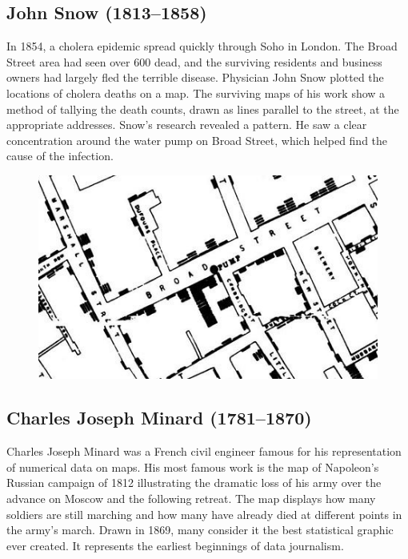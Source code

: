 \documentclass[]{book}
\theoremstyle{definition}
\theoremstyle{definition}
\theoremstyle{definition}
\theoremstyle{remark}
\begin{document}
\subsection{John Snow (1813--1858)}\label{john-snow-18131858}

In 1854, a cholera epidemic spread quickly through Soho in London. The
Broad Street area had seen over 600 dead, and the surviving residents
and business owners had largely fled the terrible disease. Physician
John Snow plotted the locations of cholera deaths on a map. The
surviving maps of his work show a method of tallying the death counts,
drawn as lines parallel to the street, at the appropriate addresses.
Snow's research revealed a pattern. He saw a clear concentration around
the water pump on Broad Street, which helped find the cause of the
infection.

\begin{figure}
\centering
\includegraphics{images/Snow.png}
\caption{}
\end{figure}

\subsection{Charles Joseph Minard
(1781--1870)}\label{charles-joseph-minard-17811870}

Charles Joseph Minard was a French civil engineer famous for his
representation of numerical data on maps. His most famous work is the
map of Napoleon's Russian campaign of 1812 illustrating the dramatic
loss of his army over the advance on Moscow and the following retreat.
The map displays how many soldiers are still marching and how many have
already died at different points in the army's march. Drawn in 1869,
many consider it the best statistical graphic ever created. It
represents the earliest beginnings of data journalism.
\end{document}
